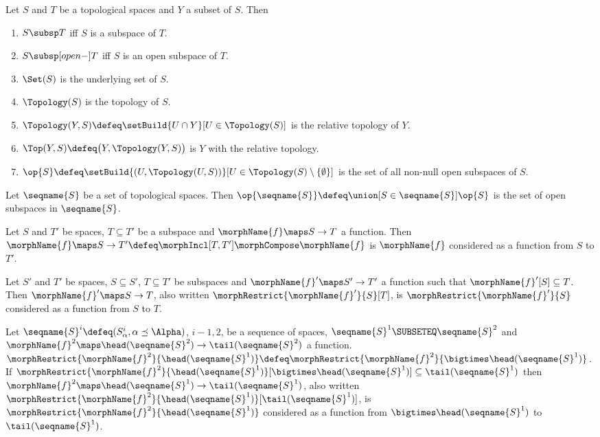 \documentclass{article}
\begin{document}
\begin{definition}
Let $S$ and $T$ be a topological spaces and $Y$ a subset of $S$. Then

\begin{enumerate}
\item
$S \subsp T$ iff $S$ is a subspace of $T$.
\item
$S \subsp[open-] T$ iff $S$ is an open subspace of $T$.
\item
$\Set(S)$ is the underlying set of $S$.
\item
$\Topology(S)$ is the topology of $S$.
\item
$\Topology(Y,S) \defeq \setBuild{U \cap Y}[{U \in \Topology(S)}]$
is the relative topology of $Y$.
\item
$\Top(Y,S) \defeq \bigl ( Y, \Topology(Y,S) \bigr )$ is $Y$ with the
relative topology.
\item
$
  \op{S} \defeq
  \setBuild
    {(U, \Topology(U,S))}%
    [{{ U \in \Topology(S) \setminus \{ \emptyset \} }}]
$
is the set of all non-null open subspaces of $S$.
\end{enumerate}

Let $\seqname{S}$ be a set of topological spaces. Then
$\op{\seqname{S}} \defeq \union [{S \in \seqname{S}}] { {\op{S}}}$ is the set
of open subspaces in $\seqname{S}$.

Let $S$ and $T'$ be spaces, $T \subseteq T'$ be a subspace and
$\morphName{f} \maps S \to T$ a function. Then
$\morphName{f} \maps S \to T' \defeq \morphIncl[{T},{T'}] \morphCompose \morphName{f}$
is $\morphName{f}$ considered as a function from $S$ to $T'$.

Let $S'$ and $T'$ be spaces, $S \subseteq S'$, $T \subseteq T'$ be
subspaces and $\morphName{f}' \maps S' \to T'$ a function such that
$\morphName{f}'[S] \subseteq T$. Then $\morphName{f}' \maps S \to T$, also
written $\morphRestrict{\morphName{f}'}{S}[T]$, is
$\morphRestrict{\morphName{f}'}{S}$ considered as a function from $S$ to
$T$.

Let $\seqname{S}^i \defeq (S^i_\alpha, \alpha \preceq \Alpha)$, $i-1,2$,
be a sequence of spaces, $\seqname{S}^1 \SUBSETEQ \seqname{S}^2$ and \linebreak
$\morphName{f}^2 \maps \head(\seqname{S}^2) \to \tail(\seqname{S}^2)$ a
function.
$
  \morphRestrict{\morphName{f}^2}{\head(\seqname{S}^1)} \defeq
  \morphRestrict{\morphName{f}^2}{\bigtimes \head(\seqname{S}^1)}
$.
If \linebreak
$
  \morphRestrict{\morphName{f}^2}{\head(\seqname{S}^1)}
    [\bigtimes \head(\seqname{S}^1)]
  \subseteq \tail(\seqname{S}^1)
$
then
$ \morphName{f}^2 \maps \head(\seqname{S}^1) \to \tail(\seqname{S}^1)$,
also written
$
  \morphRestrict{\morphName{f}^2}{\head(\seqname{S}^1)}[\tail(\seqname{S}^1)]
$,
is $\morphRestrict{\morphName{f}^2}{\head(\seqname{S}^1)}$ considered as a
function from $\bigtimes \head(\seqname{S}^1)$ to $\tail(\seqname{S}^1)$.
\end{definition}
\end{document}
